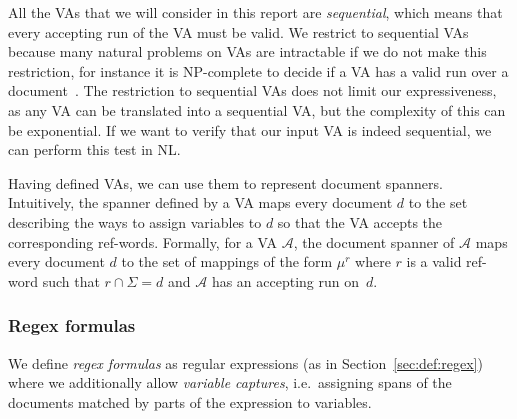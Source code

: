 \documentclass[12px]{article}
\theoremstyle{definition}
\begin{document}

        All the VAs that we will consider in this report are
        \textit{sequential}, which means that every accepting run of the VA
        must be valid. We restrict to sequential VAs because many natural
        problems on VAs are intractable if we do not make this restriction, for
        instance it is NP-complete to decide if a VA has a valid run over a
        document~\cite{freydenberger:LIPIcs:2017}. The restriction to
        sequential VAs does not limit our expressiveness, as any VA can be
        translated into a sequential VA, but the complexity of this can be
        exponential\cite{maturana2018document}. If we want to verify that our
        input VA is indeed sequential, we can perform this test in
        NL\cite{maturana2018document}.

        Having defined VAs, we can use them to represent document spanners.
        Intuitively, the spanner defined by a VA maps every document $d$ to the
        set describing the ways to assign variables to $d$ so that the VA
        accepts the corresponding ref-words. Formally, for a VA $\mathcal{A}$,
        the document spanner of $\mathcal{A}$ maps every document $d$ to the
        set of mappings of the form $\mu^r$ where $r$ is a valid ref-word such
        that $r \cap \Sigma = d$ and $\mathcal{A}$ has an accepting run on~$d$.


      \subsubsection{Regex formulas}%
        \label{sec:regex_formula}

        We define \emph{regex formulas} as regular expressions (as in
        Section~\ref{sec:def:regex}) where we additionally allow \emph{variable
        captures}, i.e.\ assigning spans of the documents matched by parts of
        the expression to variables.
\end{document}
